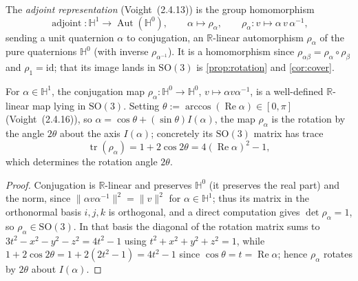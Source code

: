 \begin{definition}
    \label{def:adjoint}
    \leanok
    The \emph{adjoint representation} (Voight~(2.4.13)) is the group homomorphism
    \[
      \operatorname{adjoint} \colon \mathbb{H}^1 \to \operatorname{Aut}(\mathbb{H}^0),
      \qquad
      \alpha \mapsto \rho_\alpha, \qquad
      \rho_\alpha \colon v \mapsto \alpha\,v\,\alpha^{-1},
    \]
    sending a unit quaternion $\alpha$ to conjugation, an $\mathbb{R}$-linear
    automorphism $\rho_\alpha$ of the pure quaternions $\mathbb{H}^0$ (with inverse
    $\rho_{\alpha^{-1}}$). It is a homomorphism since
    $\rho_{\alpha\beta} = \rho_\alpha \circ \rho_\beta$ and $\rho_1 = \mathrm{id}$;
    that its image lands in $\mathrm{SO}(3)$ is \ref{prop:rotation} and \ref{cor:cover}.
\end{definition}

\begin{proposition}
    \label{prop:rotation}
    \leanok
    For $\alpha \in \mathbb{H}^1$, the conjugation map
    $\rho_\alpha \colon \mathbb{H}^0 \to \mathbb{H}^0$, $v \mapsto \alpha v\alpha^{-1}$,
    is a well-defined $\mathbb{R}$-linear map lying in $\mathrm{SO}(3)$. Setting
    $\theta := \arccos(\operatorname{Re}\alpha) \in [0, \pi]$ (Voight~(2.4.16)), so
    $\alpha = \cos\theta + (\sin\theta)I(\alpha)$, the map $\rho_\alpha$ is the
    rotation by the angle $2\theta$ about the axis $I(\alpha)$; concretely its
    $\mathrm{SO}(3)$ matrix has trace
    \[
      \operatorname{tr}(\rho_\alpha) = 1 + 2\cos 2\theta = 4(\operatorname{Re}\alpha)^2 - 1,
    \]
    which determines the rotation angle $2\theta$.
\end{proposition}
\begin{proof}
    Conjugation is $\mathbb{R}$-linear and preserves $\mathbb{H}^0$ (it preserves
    the real part) and the norm, since
    $\lVert\alpha v\alpha^{-1}\rVert^2 = \lVert v\rVert^2$ for $\alpha \in \mathbb{H}^1$;
    thus its matrix in the orthonormal basis $i, j, k$ is orthogonal, and a direct
    computation gives $\det\rho_\alpha = 1$, so $\rho_\alpha \in \mathrm{SO}(3)$.
    In that basis the diagonal of the rotation matrix sums to
    $3t^2 - x^2 - y^2 - z^2 = 4t^2 - 1$ using $t^2 + x^2 + y^2 + z^2 = 1$, while
    $1 + 2\cos 2\theta = 1 + 2(2t^2 - 1) = 4t^2 - 1$ since
    $\cos\theta = t = \operatorname{Re}\alpha$; hence $\rho_\alpha$ rotates by
    $2\theta$ about $I(\alpha)$.
\end{proof}

